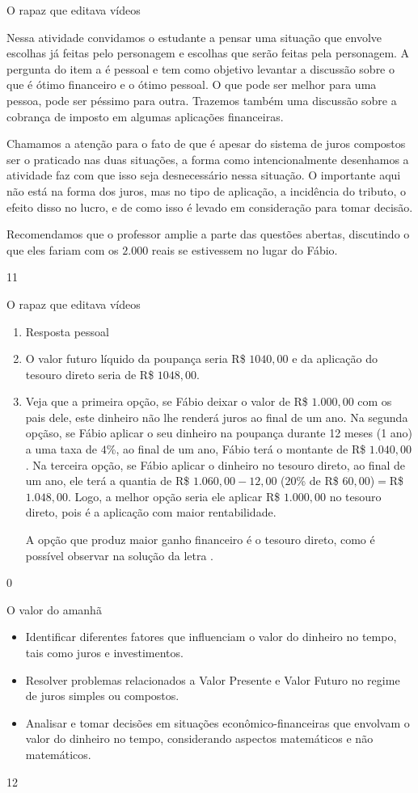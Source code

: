 \begin{sugestions}{O rapaz que editava vídeos}
{
Nessa atividade convidamos o estudante a pensar uma situação que envolve escolhas já feitas pelo personagem e escolhas que serão feitas pela personagem. A pergunta do item a é pessoal e tem como objetivo levantar a discussão sobre o que é ótimo financeiro e o ótimo pessoal. O que pode ser melhor para uma pessoa, pode ser péssimo para outra. Trazemos também uma discussão sobre a cobrança de imposto em algumas aplicações financeiras.

Chamamos a atenção para o fato de que é apesar do sistema de juros compostos ser o praticado nas duas situações, a forma como intencionalmente desenhamos a atividade faz com que isso seja desnecessário nessa situação. O importante aqui não está na forma dos juros, mas no tipo de aplicação, a incidência do tributo, o efeito disso no lucro, e de como isso é levado em consideração para tomar decisão.

Recomendamos que o professor amplie a parte das questões abertas, discutindo o que eles fariam com os $2.000$ reais se estivessem no lugar do Fábio.
}{1}{1}
\end{sugestions}
\begin{answer}{O rapaz que editava vídeos}
{
  \begin{enumerate}
    \item Resposta pessoal
    \item O valor futuro líquido da poupança seria R\$ $1040{,}00$ e da aplicação do tesouro direto seria de R\$ $1048{,}00$.

    \item Veja que a primeira opção, se Fábio deixar o valor de R\$ $1.000{,}00$ com os pais dele, este dinheiro não lhe renderá juros ao final de um ano. Na segunda opçãso, se Fábio aplicar o seu dinheiro na poupança durante 12 meses (1 ano) a uma taxa de $4$\%, ao final de um ano, Fábio terá o montante de R\$ $1.040{,}00$. Na terceira opção, se Fábio aplicar o dinheiro no tesouro direto, ao final de um ano, ele terá a quantia de R\$ $1.060{,}00-12{,}00$ ($20$\% de R\$ $60{,}00$)$=$R\$ $1.048{,}00$. Logo, a melhor opção seria ele aplicar R\$ $1.000{,}00$ no tesouro direto, pois é a aplicação com maior rentabilidade.

    A opção que produz maior ganho financeiro é o tesouro direto, como é possível observar na solução da letra .
  \end{enumerate}
}{0}
\end{answer}
\clearmargin
\begin{objectives}{O valor do amanhã}
{
\begin{itemize}
\item Identificar diferentes fatores que influenciam o valor do dinheiro no tempo, tais como juros e investimentos.
\item Resolver problemas relacionados a Valor Presente e Valor Futuro no regime de juros simples ou compostos.
\item Analisar e tomar decisões em situações econômico-financeiras que envolvam o valor do dinheiro no tempo, considerando aspectos matemáticos e não matemáticos.
\end{itemize}
}{1}{2}
\end{objectives}
